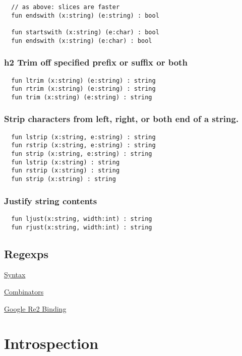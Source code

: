\documentclass[oneside]{book}
\begin{document}
{\begin{verbatim}
  // as above: slices are faster
  fun endswith (x:string) (e:string) : bool

  fun startswith (x:string) (e:char) : bool 
  fun endswith (x:string) (e:char) : bool
\end{verbatim}

\subsection{h2 Trim off specified prefix or suffix or both}
\begin{verbatim}
  fun ltrim (x:string) (e:string) : string 
  fun rtrim (x:string) (e:string) : string
  fun trim (x:string) (e:string) : string
\end{verbatim}

\subsection{Strip characters from left, right, or both end of a string.}
\begin{verbatim}
  fun lstrip (x:string, e:string) : string
  fun rstrip (x:string, e:string) : string
  fun strip (x:string, e:string) : string
  fun lstrip (x:string) : string
  fun rstrip (x:string) : string
  fun strip (x:string) : string
\end{verbatim}

\subsection{Justify string contents}
\begin{verbatim}
  fun ljust(x:string, width:int) : string
  fun rjust(x:string, width:int) : string
\end{verbatim}

\section{Regexps}

\href{http://felix-lang.org/share/lib/grammar/regexps.fsyn}{Syntax}

\href{http://felix-lang.org/share/lib/std/strings/regdef.flx}{Combinators}

\href{http://felix-lang.org/share/lib/std/strings/re2.flx}{Google Re2 Binding}

\chapter{Introspection}

}
\end{document}
